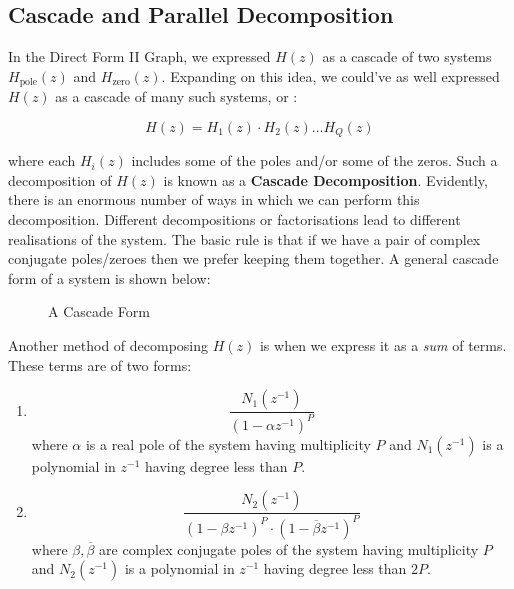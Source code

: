 \documentclass{article}
\theoremstyle{definition}
\begin{document}
\clearpage

\subsection{Cascade and Parallel Decomposition}

In the Direct Form II Graph, we expressed $H(z)$ as a cascade of two systems $H_{\text{pole}}(z)$ and $H_{\text{zero}}(z)$. Expanding on this idea, we could've as well expressed $H(z)$ as a cascade of many such systems, or :

\[
    H(z) = H_1(z) \cdot H_2(z) \ldots H_Q(z) 
\]

where each $H_i(z)$ includes some of the poles and/or some of the zeros. Such a decomposition of $H(z)$ is known as a \textbf{Cascade Decomposition}. Evidently, there is an enormous number of ways in which we can perform this decomposition. Different decompositions or factorisations lead to different realisations of the system. The basic rule is that if we have a pair of complex conjugate poles/zeroes then we prefer keeping them together. A general cascade form of a system is shown below:

\begin{figure}[!h]
  \centering
  \caption{A Cascade Form} 
  \label{fig:sfg9}
\end{figure}

Another method of decomposing $H(z)$ is when we express it as a \textit{sum} of terms. These terms are of two forms:

\begin{enumerate}
    \item 
    \[
        \frac{N_1(z^{-1})}{(1-\alpha z^{-1})^P}
    \]
    where $\alpha$ is a real pole of the system having multiplicity $P$ and $N_1(z^{-1})$ is a polynomial in $z^{-1}$ having degree less than $P$.
    \item 
    \[
        \frac{N_2(z^{-1})}{(1-\beta z^{-1})^P \cdot (1-\overline{\beta} z^{-1})^P}
    \]
    where $\beta, \overline{\beta}$ are complex conjugate poles of the system having multiplicity $P$ and $N_2(z^{-1})$ is a polynomial in $z^{-1}$ having degree less than $2P$.
\end{enumerate}
\end{document}
